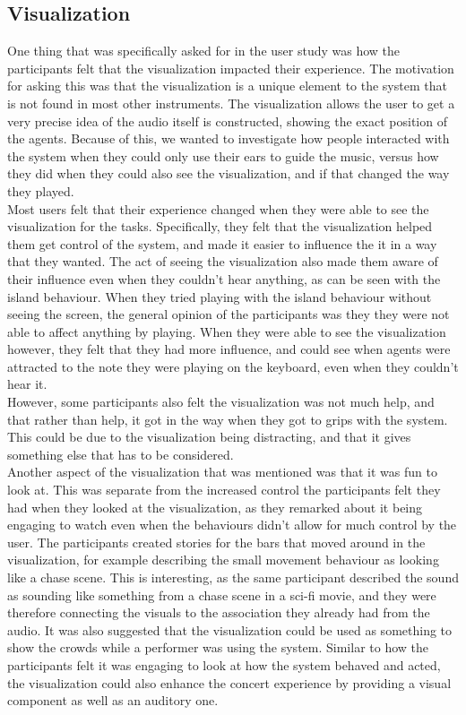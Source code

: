 \documentclass[a4paper,english]{report}
\begin{document}
	\subsection{Visualization}
	One thing that was specifically asked for in the user study was how the participants felt that the visualization impacted their experience. The motivation for asking this was that the visualization is a unique element to the system that is not found in most other instruments. The visualization allows the user to get a very precise idea of the audio itself is constructed, showing the exact position of the agents. Because of this, we wanted to investigate how people interacted with the system when they could only use their ears to guide the music, versus how they did when they could also see the visualization, and if that changed the way they played.\\
	Most users felt that their experience changed when they were able to see the visualization for the tasks. Specifically, they felt that the visualization helped them get control of the system, and made it easier to influence the it in a way that they wanted. The act of seeing the visualization also made them aware of their influence even when they couldn't hear anything, as can be seen with the island behaviour. When they tried playing with the island behaviour without seeing the screen, the general opinion of the participants was they they were not able to affect anything by playing. When they were able to see the visualization however, they felt that they had more influence, and could see when agents were attracted to the note they were playing on the keyboard, even when they couldn't hear it. \\
	However, some participants also felt the visualization was not much help, and that rather than help, it got in the way when they got to grips with the system. This could be due to the visualization being distracting, and that it gives something else that has to be considered.\\
	Another aspect of the visualization that was mentioned was that it was fun to look at. This was separate from the increased control the participants felt they had when they looked at the visualization, as they remarked about it being engaging to watch even when the behaviours didn't allow for much control by the user. The participants created stories for the bars that moved around in the visualization, for example describing the small movement behaviour as looking like a chase scene. This is interesting, as the same participant described the sound as sounding like something from a chase scene in a sci-fi movie, and they were therefore connecting the visuals to the association they already had from the audio. It was also suggested that the visualization could be used as something to show the crowds while a performer was using the system. Similar to how the participants felt it was engaging to look at how the system behaved and acted, the visualization could also enhance the concert experience by providing a visual component as well as an auditory one.
	
\end{document}
